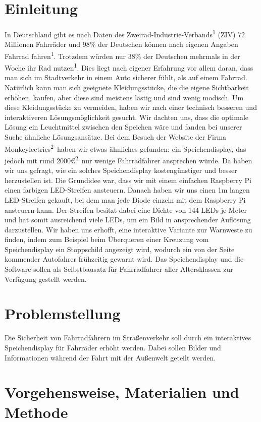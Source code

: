 \documentclass [a4paper, 11pt] {article}
\begin{document}
\section{Einleitung}
In Deutschland gibt es nach Daten des Zweirad-Industrie-Verbands\textsuperscript{1} (ZIV) 72 Millionen Fahrräder und 98\% der Deutschen können nach eigenen Angaben Fahrrad fahren\textsuperscript{1}. Trotzdem würden nur 38\% der Deutschen mehrmals in der Woche ihr Rad nutzen\textsuperscript{1}. Dies liegt nach eigener Erfahrung vor allem daran, dass man sich im Stadtverkehr in einem Auto sicherer fühlt, als auf einem Fahrrad. Natürlich kann man sich geeignete Kleidungsstücke, die die eigene Sichtbarkeit erhöhen, kaufen, aber diese sind meistens lästig und sind wenig modisch. Um diese Kleidungsstücke zu vermeiden, haben wir nach einer technisch besseren und interaktiveren Lösungsmöglichkeit gesucht. Wir dachten uns, dass die optimale Lösung ein Leuchtmittel zwischen den Speichen wäre und fanden bei unserer Suche ähnliche Lösungsansätze. Bei dem Besuch der Website der Firma Monkeylectrics\textsuperscript{2}\ haben wir etwas ähnliches gefunden: ein Speichendisplay, das jedoch mit rund 2000\euro\textsuperscript{2}\ nur wenige Fahrradfahrer ansprechen würde. Da haben wir uns gefragt, wie ein solches Speichendisplay kostengünstiger und besser herzustellen ist. Die Grundidee war, dass wir mit einem einfachen Raspberry Pi einen farbigen LED-Streifen ansteuern. Danach haben wir uns einen 1m langen LED-Streifen gekauft, bei dem man jede Diode einzeln mit dem Raspberry Pi ansteuern kann. Der Streifen besitzt dabei eine Dichte von 144 LEDs je Meter und hat somit ausreichend viele LEDs, um ein Bild in ansprechender Auflösung darzustellen. Wir haben uns erhofft, eine interaktive Variante zur Warnweste zu finden, indem zum Beispiel beim Überqueren einer Kreuzung vom Speichendisplay ein Stoppschild angezeigt wird, wodurch ein von der Seite kommender Autofahrer frühzeitig gewarnt wird. Das Speichendisplay und die Software sollen als Selbstbausatz für Fahrradfahrer aller Altersklassen zur Verfügung gestellt werden.
\section{Problemstellung}
Die Sicherheit von Fahrradfahrern im Straßenverkehr soll durch ein interaktives Speichendisplay für Fahrräder erhöht werden. Dabei sollen Bilder und Informationen während der Fahrt mit der Außenwelt geteilt werden.
\section{Vorgehensweise, Materialien und Methode}
\end{document}
